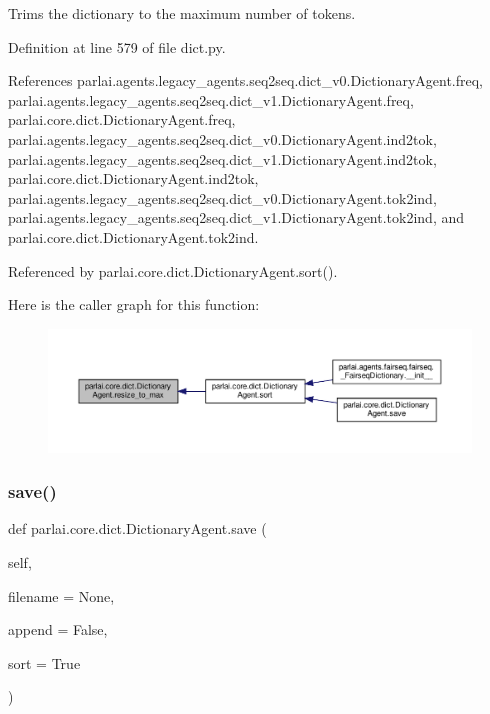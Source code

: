\begin{DoxyVerb}Trims the dictionary to the maximum number of tokens.\end{DoxyVerb}
 

Definition at line 579 of file dict.\+py.



References parlai.\+agents.\+legacy\+\_\+agents.\+seq2seq.\+dict\+\_\+v0.\+Dictionary\+Agent.\+freq, parlai.\+agents.\+legacy\+\_\+agents.\+seq2seq.\+dict\+\_\+v1.\+Dictionary\+Agent.\+freq, parlai.\+core.\+dict.\+Dictionary\+Agent.\+freq, parlai.\+agents.\+legacy\+\_\+agents.\+seq2seq.\+dict\+\_\+v0.\+Dictionary\+Agent.\+ind2tok, parlai.\+agents.\+legacy\+\_\+agents.\+seq2seq.\+dict\+\_\+v1.\+Dictionary\+Agent.\+ind2tok, parlai.\+core.\+dict.\+Dictionary\+Agent.\+ind2tok, parlai.\+agents.\+legacy\+\_\+agents.\+seq2seq.\+dict\+\_\+v0.\+Dictionary\+Agent.\+tok2ind, parlai.\+agents.\+legacy\+\_\+agents.\+seq2seq.\+dict\+\_\+v1.\+Dictionary\+Agent.\+tok2ind, and parlai.\+core.\+dict.\+Dictionary\+Agent.\+tok2ind.



Referenced by parlai.\+core.\+dict.\+Dictionary\+Agent.\+sort().

Here is the caller graph for this function\+:
\nopagebreak
\begin{figure}[H]
\begin{center}
\leavevmode
\includegraphics[width=350pt]{classparlai_1_1core_1_1dict_1_1DictionaryAgent_a1a800c1aecdb97986c59fd26f1b55626_icgraph}
\end{center}
\end{figure}
\mbox{\label{classparlai_1_1core_1_1dict_1_1DictionaryAgent_a0c6a8d8b67fe978549b328e7b7b07450}} 
\subsubsection{\texorpdfstring{save()}{save()}}
{\footnotesize\ttfamily def parlai.\+core.\+dict.\+Dictionary\+Agent.\+save (\begin{DoxyParamCaption}\item[{}]{self,  }\item[{}]{filename = {\ttfamily None},  }\item[{}]{append = {\ttfamily False},  }\item[{}]{sort = {\ttfamily True} }\end{DoxyParamCaption})}


